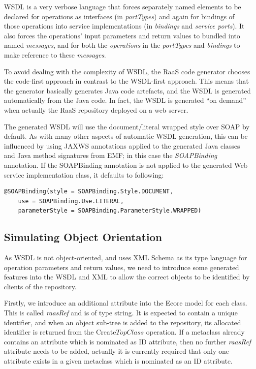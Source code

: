 \documentclass[11pt]{article}
\begin{document}
WSDL is a very verbose language that forces separately named elements to be declared for operations as interfaces (in {\em portTypes}) and again for bindings of those operations into service implementations (in {\em bindings} and {\em service ports}). It also forces the operations' input parameters and return values to bundled into named {\em messages}, and for both the {\em operations} in the {\em portTypes} and {\em bindings} to make reference to these {\em messages}.

To avoid dealing with the complexity of WSDL, the RaaS code generator chooses the code-first approach in contrast to the WSDL-first approach.
This means that the generator basically generates Java code artefacts, and the WSDL is generated automatically from the Java code.
In fact, the WSDL is generated ``on demand'' when actually the RaaS repository deployed on a web server.

The generated WSDL will use the document/literal wrapped style over SOAP by default. As with many other aspects of automatic WSDL generation, this can be influenced by using JAXWS annotations applied to the generated Java classes and Java method signatures from EMF; in this case the {\em SOAPBinding} annotation. If the SOAPBinding annotation is not applied to the generated Web service implementation class, it defaults to following:
\begin{verbatim}
@SOAPBinding(style = SOAPBinding.Style.DOCUMENT, 
    use = SOAPBinding.Use.LITERAL, 
    parameterStyle = SOAPBinding.ParameterStyle.WRAPPED)
\end{verbatim}

\subsection{Simulating Object Orientation}

As WSDL is not object-oriented, and uses XML Schema as its type language for operation parameters and return values, we need to introduce some generated features into the WSDL and XML to allow the correct objects to be identified by clients of the repository.

Firstly, we introduce an additional attribute into the Ecore model for each class. This is called {\em raasRef} and is of type string. It is expected to contain a unique identifier, and when an object sub-tree is added to the repository, its allocated identifier is returned from the Create$TopClass$ operation. If a metaclass already contains an attribute which is nominated as ID attribute, then no further {\em raasRef} attribute needs to be added, actually it is currently required that only one attribute exists in a given metaclass which is nominated as an ID attribute. 
\end{document}
